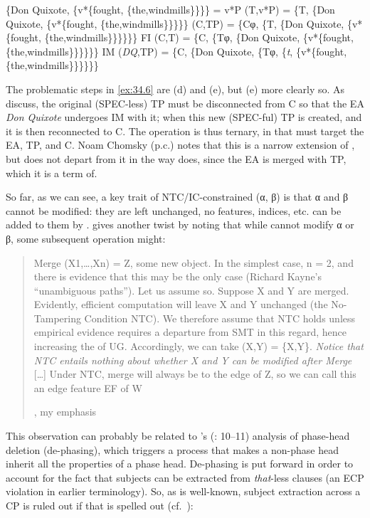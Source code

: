 \documentclass[output=paper]{langsci/langscibook}
\begin{document}
\ea%
    \label{ex:34.6}
	\ea \{Don Quixote, \{v*\{fought, \{the,windmills\}\}\}\} = v*P
	\ex {} (T,v*P) = \{T, \{Don Quixote, \{v*\{fought, \{the,windmills\}\}\}\}\}
	\ex {} (C,TP) = \{Cφ, \{T, \{Don Quixote, \{v*\{fought, \{the,windmills\}\}\}\}\}\}
	\ex \gls{FI} (C,T) = \{C, \{Tφ, \{Don Quixote, \{v*\{fought, \{the,windmills\}\}\}\}\}\}
    \ex \gls{IM} (\emph{DQ},TP) = \{C, \{Don Quixote, \{Tφ, \{\emph{t}, \{v*\{fought, \{the,windmills\}\}\}\}\}\}
	\z
\z

The problematic steps in \eqref{ex:34.6} are (d) and (e), but (e) more
clearly so. As \citet{EKS2012} discuss, the original (SPEC-less) TP must be
disconnected from C so that the \gls{EA} \emph{Don Quixote} undergoes \gls{IM}
with it; when this new (SPEC-ful) TP is created, and it is then reconnected to
C. The operation is thus ternary, in that  must target the \gls{EA}, TP,
and C.  Noam Chomsky (p.c.) notes that this is a narrow extension of , but
does not depart from it in the way  does, since the \gls{EA} is
merged with TP, which it is a term of.

So far, as we can see, a key trait of \gls{NTC}/\gls{IC}-constrained 
(α, β) is that α and β cannot be modified: they are left unchanged, no features,
indices, etc. can be added to them by . \citet{Chomsky2007} gives another
twist by noting that while  cannot modify α or β, some subsequent
operation might:

\blockquote[{\citealt[8]{Chomsky2007}, my emphasis}][.]{Merge
    (X1,\dots{},Xn) = Z, some new object. In the simplest case, n = 2, and
    there is evidence that this may be the only case (Richard Kayne’s
    “unambiguous paths”). Let us assume so. Suppose X and Y are merged.
    Evidently, efficient computation will leave X and Y unchanged (the
    No-Tampering Condition \gls{NTC}). We therefore assume that \gls{NTC} holds
    unless empirical evidence requires a departure from \gls{SMT} in this
    regard, hence increasing the  of \gls{UG}. Accordingly, we can
    take  (X,Y) = \{X,Y\}. \emph{Notice that \gls{NTC} entails nothing
    about whether X and Y can be modified after Merge} [\dots{}] Under \gls{NTC},
    merge will always be to the edge of Z, so we can call this an edge feature
    \gls{EF} of W}

This observation can probably be related to \citeauthor{Chomsky2015}’s
(\citeyear{Chomsky2015}: 10--11) analysis of phase-head deletion (de-phasing),
which triggers a process that makes a non-phase head inherit all the properties
of a phase head.  De-phasing is put forward in order to account for the fact
that subjects can be extracted from \emph{that}{}-less clauses (an \gls{ECP}
violation in earlier terminology). So, as is well-known, subject extraction
across a CP is ruled out if that is spelled out
(cf.~\citealt{Chomsky1986,Rizzi1990}):
\end{document}
